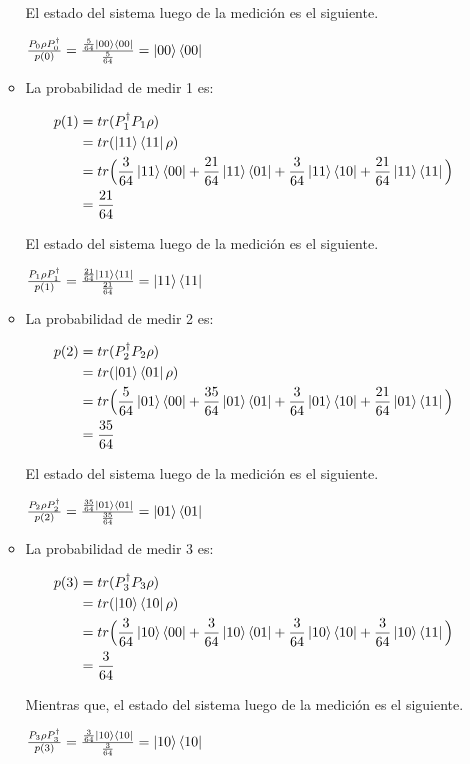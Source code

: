 \documentclass[a4paper,11pt]{article}
\begin{document}
\begin{enumerate}[label=\alph*)]
\begin{itemize}
  El estado del sistema luego de la medición es el siguiente.

  $\frac{P_0 \rho P_{0}^{\dag}}{p(0)} = \frac{\frac{5}{64} \left\vert{00}\right\rangle\left\langle{00}\right\vert}{\frac{5}{64}} = \left\vert{00}\right\rangle\left\langle{00}\right\vert$

\item La probabilidad de medir 1 es:

  \begin{align*}
    p(1)
    &= tr( P_1^{\dag} P_1 \rho )
    \\ &=  tr( \left\vert{11}\right\rangle\left\langle{11}\right\vert \rho )
    \\ &= tr \Big( \frac{3}{64}\left\vert{11}\right\rangle\left\langle{00}\right\vert + \frac{21}{64} \left\vert{11}\right\rangle\left\langle{01}\right\vert + \frac{3}{64} \left\vert{11}\right\rangle\left\langle{10}\right\vert + 
         \frac{21}{64}\left\vert{11}\right\rangle\left\langle{11}\right\vert \Big)
    \\ &= \frac{21}{64}
  \end{align*}

  El estado del sistema luego de la medición es el siguiente.

  $\frac{P_1 \rho P_{1}^{\dag}}{p(1)} = \frac{\frac{21}{64} \left\vert{11}\right\rangle\left\langle{11}\right\vert}{\frac{21}{64}} = \left\vert{11}\right\rangle\left\langle{11}\right\vert$
  
\item La probabilidad de medir 2 es:

  \begin{align*}
    p(2)
    &= tr( P_2^{\dag} P_2 \rho )
    \\ &=  tr( \left\vert{01}\right\rangle\left\langle{01}\right\vert \rho )
    \\ &= tr \Big( \frac{5}{64}\left\vert{01}\right\rangle\left\langle{00}\right\vert + \frac{35}{64} \left\vert{01}\right\rangle\left\langle{01}\right\vert + \frac{3}{64} \left\vert{01}\right\rangle\left\langle{10}\right\vert + 
         \frac{21}{64}\left\vert{01}\right\rangle\left\langle{11}\right\vert \Big)
    \\ &= \frac{35}{64}
  \end{align*}

  El estado del sistema luego de la medición es el siguiente.

  $\frac{P_2 \rho P_{2}^{\dag}}{p(2)} = \frac{\frac{35}{64} \left\vert{01}\right\rangle\left\langle{01}\right\vert}{\frac{35}{64}} = \left\vert{01}\right\rangle\left\langle{01}\right\vert$

\item La probabilidad de medir 3 es:

  \begin{align*}
    p(3)
    &= tr( P_3^{\dag} P_3 \rho )
    \\ &=  tr( \left\vert{10}\right\rangle\left\langle{10}\right\vert \rho )
    \\ &= tr \Big( \frac{3}{64}\left\vert{10}\right\rangle\left\langle{00}\right\vert + \frac{3}{64} \left\vert{10}\right\rangle\left\langle{01}\right\vert + \frac{3}{64} \left\vert{10}\right\rangle\left\langle{10}\right\vert + 
         \frac{3}{64}\left\vert{10}\right\rangle\left\langle{11}\right\vert \Big)
    \\ &= \frac{3}{64}
  \end{align*}

  Mientras que, el estado del sistema luego de la medición es el siguiente.

  $\frac{P_3 \rho P_{3}^{\dag}}{p(3)} = \frac{\frac{3}{64} \left\vert{10}\right\rangle\left\langle{10}\right\vert}{\frac{3}{64}} = \left\vert{10}\right\rangle\left\langle{10}\right\vert$

\end{itemize}

\end{enumerate}
\end{document}
